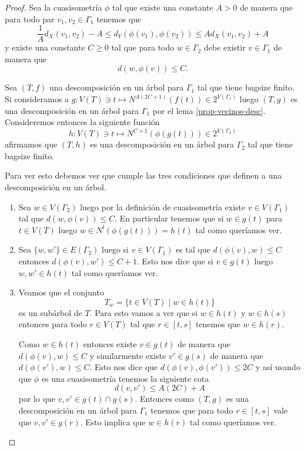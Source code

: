 \documentclass[tesis.tex]{subfiles}
\begin{document}
\begin{proof}
	Sea la cuasisometría $\phi$ tal que existe una constante $A > 0$ de manera que para todo par $v_{1}, v_{2} \in \Gamma_{1}$ tenemos que
	\[
	\frac{1}{A} d_X(v_1,v_2) - A \le d_Y(\phi(v_1),\phi(v_2)) \le A d_X(v_1,v_2) + A
	\]
	y existe una constante $C \ge 0$ tal que para todo $w \in \Gamma_{2}$ debe existir $v \in \Gamma_{1}$ de manera que
	\[
	d(w,\phi(v)) \le C.
	\]
	
	Sea $(T,f)$ una descomposición en un árbol para $\Gamma_{1}$ tal que tiene bagsize finito.
	Si consideramos a $g: V(T) \ni t \mapsto N^{A(2C+1)}(f(t)) \in 2^{V(\Gamma_{1})}$ luego $(T,g)$ es una descomposición en un árbol para $\Gamma_{1}$ por el lema \ref{prop-vecinos-desc}.
	Consideremos entonces la siguiente función 
	\[
		h: V(T) \ni t \mapsto N^{C+1}(\phi(g(t))) \in 2^{V(\Gamma_{2})}
	\]
	afirmamos que $(T,h)$ es una descomposición en un árbol para $\Gamma_{2}$ tal que tiene bagsize finito.
	
	
	Para ver esto debemos ver que cumple las tres condiciones que definen a una descomposición en un árbol.
	\begin{enumerate}[T1.]
		\item Sea $w \in V(\Gamma_{2})$ luego por la definición de cuasisometría existe $v \in V(\Gamma_{1})$ tal que $d(w, \phi(v)) \le C$.
		En particular tenemos que si $w \in g(t)$ para $t \in V(T)$ luego  $w \in N^l(\phi(g(t))) = h(t)$ tal como queríamos ver.
		
		\item Sea $\{w,w'\} \in E(\Gamma_{2})$ luego si $v \in V(\Gamma_{1})$ es tal que $d(\phi(v),w) \le C$ entonces $d(\phi(v),w') \le C+1$.
		Esto nos dice que si $v \in g(t)$ luego $w,w' \in h(t)$ tal como queríamos ver.
		
		\item Veamos que el conjunto 
		\[
			T_{w} = \{ t \in V(T) \mid w \in h(t)   \}
		\]
		es un subárbol de $T$.
		Para esto vamos a ver que si $w \in h(t)$ y $w \in h(s)$ entonces para todo $r \in V(T)$ tal que $r \in [t,s]$ tenemos que $w \in h(r)$.
		
		Como $w \in h(t)$ entonces existe $v \in g(t)$ de manera que $d(\phi(v),w) \le C$ y similarmente existe $v' \in g(s)$ de manera que $d(\phi(v'),w) \le C$.
		Esto nos dice que 
		$ d(\phi(v), \phi(v')) \le 2C$
		y así usando que $\phi$ es una cuasisometría tenemos la siguiente cota
		\[
			d(v,v') \le A(2C)+A
		\]
		por lo que $v,v' \in g(t) \cap g(s)$.
		Entonces como $(T,g)$ es una descomposición en un árbol para $\Gamma_{1}$ tenemos que para todo $r \in [t,s]$ vale que $v,v' \in g(r)$.
		Esto implica que $w \in h(r)$ tal como queríamos ver.
	\end{enumerate}
	
\end{proof}
\end{document}
